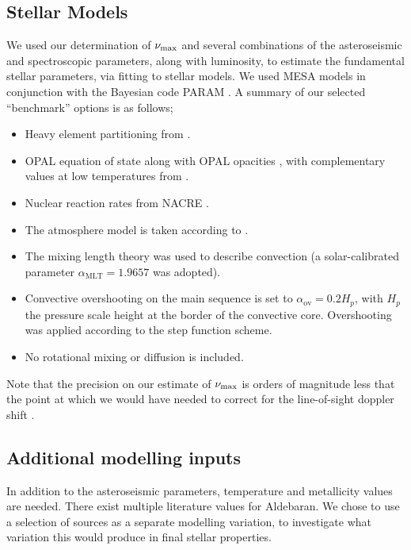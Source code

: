 \documentclass[modern]{aastex61}
\newcommand{\numax}{\mbox{$\nu_{\rm max}$}\xspace}
\begin{document}
\subsection{Stellar Models}\label{sec:stell_mod}
We used our determination of \numax and several combinations of the asteroseismic and spectroscopic parameters, along with luminosity, to estimate the fundamental stellar parameters, via fitting to stellar models. We used \textsc{MESA} models \citep{2011Paxton,2013Paxton} in conjunction with the Bayesian code \textsc{PARAM} \citep{2006dasilva, 2017Rod}.  A summary of our selected ``benchmark'' options is as follows; 
\begin{itemize}%
\item Heavy element partitioning from \cite{1993Grevesse}.
\item OPAL equation of state \citep{2002Rogers} along with OPAL opacities \citep{1996Iglesias}, with complementary values at low temperatures from \cite{2005Ferguson}.
\item Nuclear reaction rates from NACRE \citep{1999Angulo}.
\item The atmosphere model is taken according to \cite{1966Kris}.
\item The mixing length theory was used to describe convection (a solar-calibrated parameter $\alpha_{\textrm{MLT}} =1.9657$ was adopted).
\item Convective overshooting on the main sequence is set to $\alpha_{\textrm{ov}}=0.2H_{p}$, with $H_{p}$ the pressure scale height at the border of the convective core. Overshooting was applied according to the \cite{1975Maeder} step function
scheme.
\item No rotational mixing or diffusion is included.
\end{itemize}
Note that the precision on our estimate of \numax is orders of magnitude less that the point at which we would have needed to correct for the line-of-sight doppler shift \citep{2014MNRAS.445L..94D}.
\subsection{Additional modelling inputs}\label{sec:addmod}
In addition to the asteroseismic parameters, temperature and metallicity values are needed. There exist multiple literature values for Aldebaran. We chose to use a selection of sources as a separate modelling variation, to investigate what variation this would produce in final stellar properties. 
\end{document}
